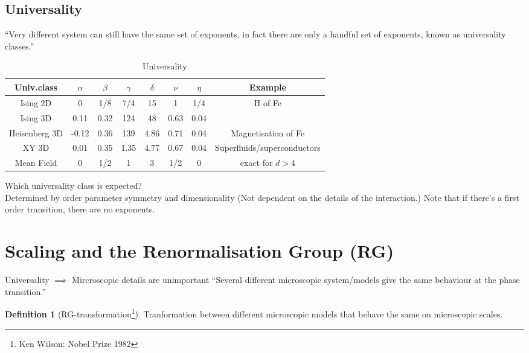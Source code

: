 \documentclass[11pt]{book}
\theoremstyle{definition}
\newtheorem{defn}{Definition}[section]
\begin{document}
\subsection{Universality}
``Very different system can still have the same set of exponents, in fact there are only a handful set of exponents, known as universality classes.''
\begin{table}[h]
	\centering
	\caption{Universality}
	\label{tab:label}

	\begin{tabular}{c|cccccc|c}
		\toprule
		Univ.class & $\alpha$ & $\beta$ & $\gamma$ & $\delta$ & $ \nu $ & $\eta$ & Example \\
		\midrule
		Ising 2D & 0 & 1/8 & 7/4 & 15 & 1 & 1/4 & H of Fe \\
		Ising 3D & 0.11 & 0.32 & 124 & 48 & 0.63 & 0.04 &  \\
		Heisenberg 3D & -0.12 & 0.36 & 139 & 4.86 & 0.71 & 0.04 & Magnetisation of Fe \\
		XY 3D & 0.01 & 0.35 & 1.35 & 4.77 & 0.67 & 0.04 & Superfluids/superconductors \\
		Mean Field & 0 & 1/2 & 1 & 3 & 1/2 & 0 & exact for $ d>4 $ \\
		\bottomrule
	\end{tabular}
\end{table}

Which universality class is expected? \\
Determined by order parameter symmetry and dimensionality (Not dependent on the details of the interaction.) Note that if there's a first order transition, there are no exponents. \\

\section{Scaling and the Renormalisation Group (RG)}
Universality $ \implies $ Mircroscopic details are unimportant ``Several different microscopic system/models give the same behaviour at the phase transition.'' 
\begin{defn}[RG-transformation\footnote{Ken Wilson: Nobel Prize 1982}]
	Tranformation between different microscopic models that behave the same on microscopic scales. 
\end{defn}
\end{document}
